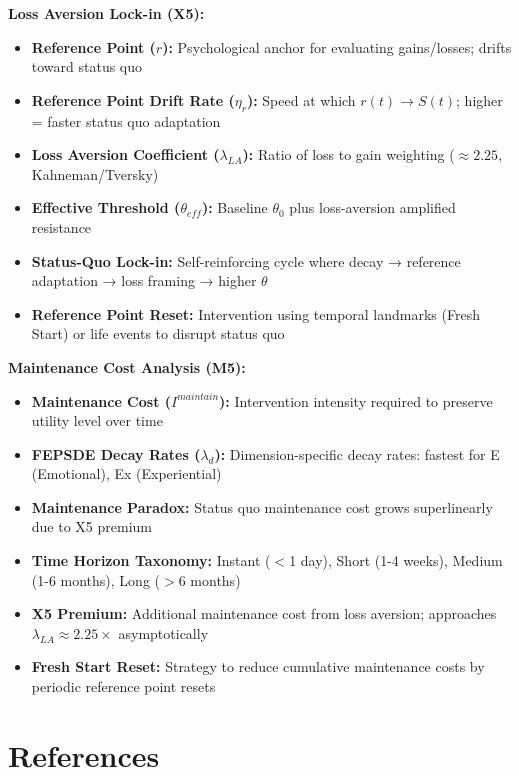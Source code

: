 \textbf{Loss Aversion Lock-in (X5):}
\begin{itemize}[nosep]
    \item \textbf{Reference Point ($r$):} Psychological anchor for evaluating gains/losses; drifts toward status quo
    \item \textbf{Reference Point Drift Rate ($\eta_r$):} Speed at which $r(t) \to S(t)$; higher = faster status quo adaptation
    \item \textbf{Loss Aversion Coefficient ($\lambda_{LA}$):} Ratio of loss to gain weighting ($\approx 2.25$, Kahneman/Tversky)
    \item \textbf{Effective Threshold ($\theta_{eff}$):} Baseline $\theta_0$ plus loss-aversion amplified resistance
    \item \textbf{Status-Quo Lock-in:} Self-reinforcing cycle where decay → reference adaptation → loss framing → higher $\theta$
    \item \textbf{Reference Point Reset:} Intervention using temporal landmarks (Fresh Start) or life events to disrupt status quo
\end{itemize}

\textbf{Maintenance Cost Analysis (M5):}
\begin{itemize}[nosep]
    \item \textbf{Maintenance Cost ($I^{maintain}$):} Intervention intensity required to preserve utility level over time
    \item \textbf{FEPSDE Decay Rates ($\lambda_d$):} Dimension-specific decay rates: fastest for E (Emotional), Ex (Experiential)
    \item \textbf{Maintenance Paradox:} Status quo maintenance cost grows superlinearly due to X5 premium
    \item \textbf{Time Horizon Taxonomy:} Instant ($<$1 day), Short (1-4 weeks), Medium (1-6 months), Long ($>$6 months)
    \item \textbf{X5 Premium:} Additional maintenance cost from loss aversion; approaches $\lambda_{LA} \approx 2.25\times$ asymptotically
    \item \textbf{Fresh Start Reset:} Strategy to reduce cumulative maintenance costs by periodic reference point resets
\end{itemize}

\section{References}
\label{sec:untcm-references}

